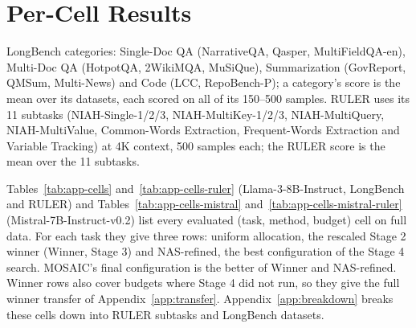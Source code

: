 \clearpage
\appendix
\setcounter{topnumber}{4}\setcounter{bottomnumber}{2}\setcounter{totalnumber}{6}\setcounter{dbltopnumber}{3}
\renewcommand{\topfraction}{0.95}\renewcommand{\bottomfraction}{0.6}\renewcommand{\textfraction}{0.05}
\renewcommand{\floatpagefraction}{0.6}\renewcommand{\dblfloatpagefraction}{0.6}
\makeatletter
\setlength{\@fptop}{0pt}\setlength{\@fpsep}{14pt}\setlength{\@fpbot}{0pt plus 1fil}
\setlength{\@dblfptop}{0pt}\setlength{\@dblfpsep}{14pt}\setlength{\@dblfpbot}{0pt plus 1fil}
\makeatother
\renewcommand{\topfraction}{0.97}\renewcommand{\bottomfraction}{0.9}\renewcommand{\textfraction}{0.03}
\renewcommand{\floatpagefraction}{0.85}\renewcommand{\dbltopfraction}{0.97}\renewcommand{\dblfloatpagefraction}{0.85}
\setcounter{topnumber}{4}\setcounter{dbltopnumber}{3}\setcounter{totalnumber}{6}

\section{Per-Cell Results}
\label{app:cells}


LongBench categories: Single-Doc QA (NarrativeQA, Qasper, MultiFieldQA-en), Multi-Doc QA (HotpotQA, 2WikiMQA, MuSiQue), Summarization (GovReport, QMSum, Multi-News) and Code (LCC, RepoBench-P); a category's score is the mean over its datasets, each scored on all of its 150--500 samples. RULER uses its 11 subtasks (NIAH-Single-1/2/3, NIAH-MultiKey-1/2/3, NIAH-MultiQuery, NIAH-MultiValue, Common-Words Extraction, Frequent-Words Extraction and Variable Tracking) at 4K context, 500 samples each; the RULER score is the mean over the 11 subtasks.

Tables~\ref{tab:app-cells} and~\ref{tab:app-cells-ruler} (Llama-3-8B-Instruct, LongBench and RULER) and Tables~\ref{tab:app-cells-mistral} and~\ref{tab:app-cells-mistral-ruler} (Mistral-7B-Instruct-v0.2) list every evaluated (task, method, budget) cell on full data. For each task they give three rows: uniform allocation, the rescaled Stage 2 winner (Winner, Stage 3) and NAS-refined, the best configuration of the Stage 4 search. MOSAIC's final configuration is the better of Winner and NAS-refined. Winner rows also cover budgets where Stage 4 did not run, so they give the full winner transfer of Appendix~\ref{app:transfer}. Appendix~\ref{app:breakdown} breaks these cells down into RULER subtasks and LongBench datasets.



